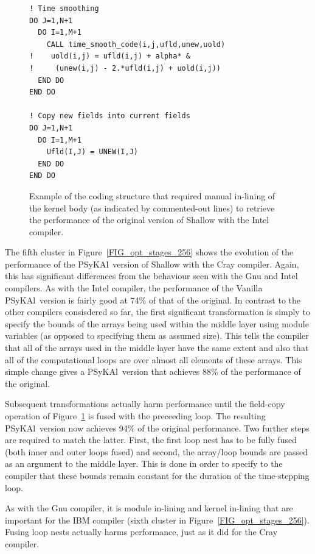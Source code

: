 \documentclass[journal]{IEEEtran}
\newcommand{\psykal}{{PS}y{KA}l\ }
\begin{document}
\begin{figure}
\begin{verbatim}
! Time smoothing
DO J=1,N+1
  DO I=1,M+1
    CALL time_smooth_code(i,j,ufld,unew,uold)
!    uold(i,j) = ufld(i,j) + alpha* &
!     (unew(i,j) - 2.*ufld(i,j) + uold(i,j))
  END DO
END DO

! Copy new fields into current fields
DO J=1,N+1
  DO I=1,M+1
    Ufld(I,J) = UNEW(I,J)
  END DO
END DO
\end{verbatim}
\caption{Example of the coding structure that required manual
  in-lining of the kernel body (as indicated by commented-out lines)
  to retrieve the performance of the original version of Shallow with
  the Intel compiler.}
\label{FIG_time_smooth_code}
\end{figure}

The fifth cluster in Figure~\ref{FIG_opt_stages_256} shows the
evolution of the performance of the \psykal version of Shallow with
the Cray compiler. Again, this has significant differences from the
behaviour seen with the Gnu and Intel compilers. As with the Intel
compiler, the performance of the Vanilla \psykal version is fairly
good at 74\% of that of the original. In contrast to the other
compilers consisdered so far, the first significant transformation is
simply to specify the bounds of the arrays being used within the
middle layer using module variables (as opposed to specifying them as
assumed size). This tells the compiler that all of the arrays used in
the middle layer have the same extent and also that all of the
computational loops are over almost all elements of these arrays. This
simple change gives a \psykal version that achieves 88\% of the
performance of the original.

Subsequent transformations actually harm performance until the
field-copy operation of Figure~\ref{FIG_time_smooth_code} is fused
with the preceeding loop. The resulting \psykal version now achieves
94\% of the original performance. Two further steps are required to
match the latter. First, the first loop nest has to be fully fused
(both inner and outer loops fused) and second, the array/loop bounds
are passed as an argument to the middle layer. This is done in order
to specify to the compiler that these bounds remain constant for the
duration of the time-stepping loop.

As with the Gnu compiler, it is module in-lining and kernel in-lining
that are important for the IBM compiler (sixth cluster in
Figure~\ref{FIG_opt_stages_256}). Fusing loop nests actually harms
performance, just as it did for the Cray compiler.
\end{document}
